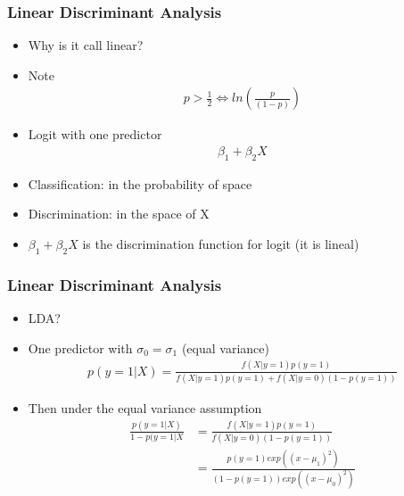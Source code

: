 \documentclass[
  shownotes,
  xcolor={svgnames},
  hyperref={colorlinks,citecolor=DarkBlue,linkcolor=DarkRed,urlcolor=DarkBlue}
  , aspectratio=169]{beamer}
\begin{document}
\begin{frame}[fragile]
\frametitle{Linear Discriminant Analysis}

\begin{itemize}
  \item Why is it call linear?
  \item Note
  \begin{align}
    p>\frac{1}{2} \iff ln(\frac{p}{(1-p)})
  \end{align}
  \item Logit with one predictor
  \begin{align}
  \beta_1 + \beta_2 X
  \end{align}
  \item Classification: in the probability of space
  \item Discrimination: in the space of X
  \item $\beta_1 +\beta_2 X$ is the discrimination function for logit (it is lineal)
\end{itemize}

\end{frame}
\begin{frame}[fragile]
\frametitle{Linear Discriminant Analysis}
\begin{itemize}
  \item LDA?
  \item One predictor with $\sigma_0 = \sigma_1$ (equal variance)
  \begin{align}
  p (y=1|X)=\frac{f(X|y=1)p(y=1)}{f(X|y=1)p(y=1) + f(X|y=0)(1-p(y=1))}
  \end{align}
  \item Then under the equal variance assumption
  \begin{align}
  \frac{p (y=1|X)}{1-p (y=1|X} &= \frac{f(X|y=1)p(y=1)}{f(X|y=0)(1-p(y=1))} \\
                                &= \frac{p(y=1)exp((x-\mu_1)^2)}{(1-p(y=1))exp((x-\mu_0)^2)} 
  \end{align}
\end{itemize}

\end{frame}
\end{document}
